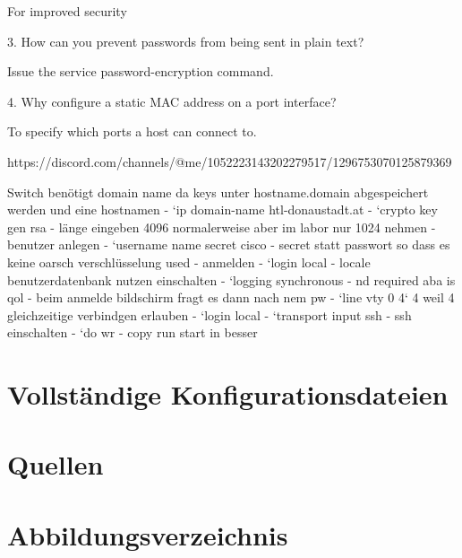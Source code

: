 \documentclass[a4paper]{article}
\begin{document}
For improved security

3. How can you prevent passwords from being sent in plain text?

Issue the service password-encryption command.

4. Why configure a static MAC address on a port interface?

To specify which ports a host can connect to.

https://discord.com/channels/@me/1052223143202279517/1296753070125879369
\newpage

Switch benötigt domain name da keys unter hostname.domain abgespeichert werden und eine hostnamen
- `ip domain-name htl-donaustadt.at
- `crypto key gen rsa
	- länge eingeben 4096 normalerweise aber im labor nur 1024 nehmen
- benutzer anlegen
	- `username name secret cisco
		- secret statt passwort so dass es keine oarsch verschlüsselung used
	- anmelden
		- `login local
			- locale benutzerdatenbank nutzen einschalten
		- `logging synchronous
			- nd required aba is qol
		- beim anmelde bildschirm fragt es dann nach nem pw
- `line vty 0 4` 4 weil 4 gleichzeitige verbindgen erlauben
	- `login local
	- `transport input ssh
		- ssh einschalten
	- `do wr
		- copy run start in besser


\section{Vollständige Konfigurationsdateien}

\newpage

\section{Quellen}

\newpage
\section{Abbildungsverzeichnis}

\listoffigures
\end{document}
